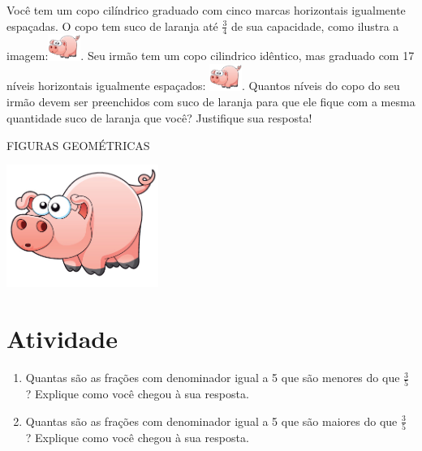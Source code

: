 \documentclass[a4,12pt]{book}
\begin{document}
Você tem um copo cilíndrico graduado com cinco marcas horizontais igualmente espaçadas. O copo tem suco de laranja até $\frac{3}{4}$ de sua capacidade, como ilustra a imagem:\includegraphics[width=30pt, keepaspectratio]{pig}. Seu irmão tem um copo cilindrico idêntico, mas graduado com 17 níveis horizontais igualmente espaçados: \includegraphics[width=30pt, keepaspectratio]{pig}.  Quantos níveis do copo do seu irmão devem ser preenchidos com suco de laranja para que ele fique com a mesma quantidade suco de laranja que você? Justifique sua resposta!

\begin{imagem*}[breakable]{}{}   FIGURAS GEOMÉTRICAS\end{imagem*}





\includegraphics[width=\textwidth,height=4cm, keepaspectratio]{pig}
\section{Atividade}







\begin{enumerate} [\quad a)] %
  \item     Quantas são as frações com denominador igual a 5 que são menores do que     $\frac{3}{5}$    ? Explique como você chegou à sua resposta.
  \item     Quantas são as frações com denominador igual a 5 que são maiores do que     $\frac{3}{5}$    ? Explique como você chegou à sua resposta.
\end{enumerate} %
\end{document}
